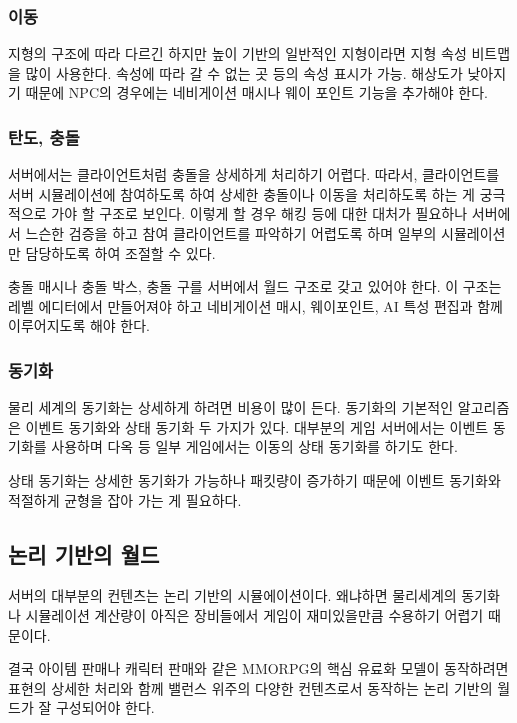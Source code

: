 \documentclass[chapter,kosection, 10.5pt, romanfixed, a4paper]{oblivoir}
\begin{document}
\subsubsection{이동}

지형의 구조에 따라 다르긴 하지만 높이 기반의 일반적인 지형이라면 지형 속성 비트맵을
많이 사용한다. 속성에 따라 갈 수 없는 곳 등의 속성 표시가 가능. 해상도가 낮아지기 때문에
NPC의 경우에는 네비게이션 매시나 웨이 포인트 기능을 추가해야 한다. 

\subsubsection{탄도, 충돌}

서버에서는 클라이언트처럼 충돌을 상세하게 처리하기 어렵다. 따라서, 클라이언트를 서버 
시뮬레이션에 참여하도록 하여 상세한 충돌이나 이동을 처리하도록 하는 게 궁극적으로 
가야 할 구조로 보인다. 이렇게 할 경우 해킹 등에 대한 대처가 필요하나 서버에서 
느슨한 검증을 하고 참여 클라이언트를 파악하기 어렵도록 하며 일부의 시뮬레이션만
담당하도록 하여 조절할 수 있다. 

충돌 매시나 충돌 박스, 충돌 구를 서버에서 월드 구조로 갖고 있어야 한다. 이 구조는 
레벨 에디터에서 만들어져야 하고 네비게이션 매시, 웨이포인트, AI 특성 편집과 함께 
이루어지도록 해야 한다. 

\subsubsection{동기화}

물리 세계의 동기화는 상세하게 하려면 비용이 많이 든다. 동기화의 기본적인 알고리즘은
이벤트 동기화와 상태 동기화 두 가지가 있다. 대부분의 게임 서버에서는 이벤트 동기화를
사용하며 다옥 등 일부 게임에서는 이동의 상태 동기화를 하기도 한다. 

상태 동기화는 상세한 동기화가 가능하나 패킷량이 증가하기 때문에 이벤트 동기화와 
적절하게 균형을 잡아 가는 게 필요하다. 

\subsection{논리 기반의 월드}

서버의 대부분의 컨텐츠는 논리 기반의 시뮬에이션이다. 왜냐하면 물리세계의 동기화나 
시뮬레이션 계산량이 아직은 장비들에서 게임이 재미있을만큼 수용하기 어렵기 때문이다.

결국 아이템 판매나 캐릭터 판매와 같은 MMORPG의 핵심 유료화 모델이 동작하려면 
표현의 상세한 처리와 함께 밸런스 위주의 다양한 컨텐츠로서 동작하는 논리 기반의 
월드가 잘 구성되어야 한다. 
\end{document}
